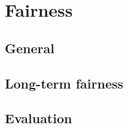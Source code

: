 \chapter{Fairness} \label{chap_fairness}

\section{General}

\section{Long-term fairness}

\section{Evaluation}